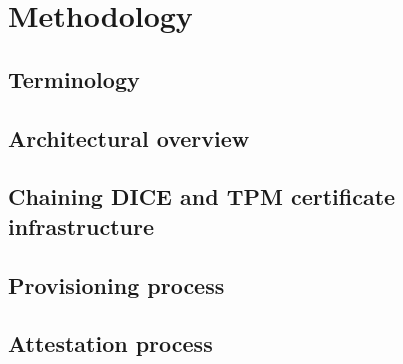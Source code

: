 
\chapter{Methodology}\label{chapter:methodology}

\section{Terminology}


\section{Architectural overview}




\section{Chaining DICE and TPM certificate infrastructure}

\section{Provisioning process}


\section{Attestation process}


